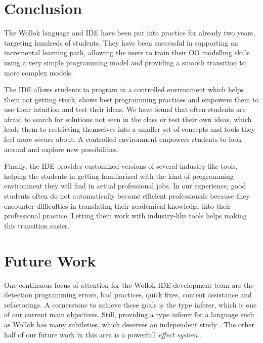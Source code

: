\section{Conclusion}
\label{sec:conclusion}


The Wollok language and IDE have been put into practice for already two years, targeting hundreds of students.
They have been successful in supporting an incremental learning path, allowing the users to train their OO modelling skills using a very simple programming model and providing a smooth transition to more complex models.


The IDE allows students to program in a controlled environment which helps them not getting stuck, shows best programming practices and empowers them to use their intuition and test their ideas.
We have found that often students are afraid to search for solutions not seen in the class or test their own ideas, 
which leads them to restricting themselves into a smaller set of concepts and tools they feel more secure about.
A controlled environment empowers students to look around and explore new possibilities.

Finally, the IDE provides customized versions of several industry-like tools, helping the students in getting familiarized with the kind of programming environment they will find in actual professional jobs.
In our experience, good students often do not automatically become efficient professionals because they encounter difficulties in translating their academical knowledge into their professional practice.
Letting them work with industry-like tools helps making this transition easier.

\section{Future Work}
\label{sec:furtherWork}
One continuous focus of attention for the Wollok IDE development team are the detection programming errors, bad practices, quick fixes, content assistance and refactorings.
A cornerstone to achieve these goals is the type inferer, which is one of our current main objectives.
Still, providing a type inferer for a language such as Wollok has many subtleties, which deserves an independent study \cite{passerini_nicolas_extensible_2014}.
The other half of our future work in this area is a powerfull \emph{effect system} \cite{nielson_type_1999}.

